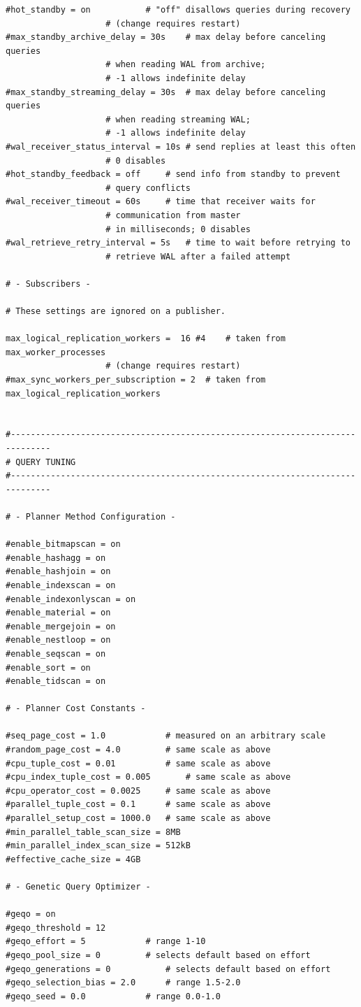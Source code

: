 \begin{verbatim}
#hot_standby = on			# "off" disallows queries during recovery
					# (change requires restart)
#max_standby_archive_delay = 30s	# max delay before canceling queries
					# when reading WAL from archive;
					# -1 allows indefinite delay
#max_standby_streaming_delay = 30s	# max delay before canceling queries
					# when reading streaming WAL;
					# -1 allows indefinite delay
#wal_receiver_status_interval = 10s	# send replies at least this often
					# 0 disables
#hot_standby_feedback = off		# send info from standby to prevent
					# query conflicts
#wal_receiver_timeout = 60s		# time that receiver waits for
					# communication from master
					# in milliseconds; 0 disables
#wal_retrieve_retry_interval = 5s	# time to wait before retrying to
					# retrieve WAL after a failed attempt

# - Subscribers -

# These settings are ignored on a publisher.

max_logical_replication_workers =  16 #4	# taken from max_worker_processes
					# (change requires restart)
#max_sync_workers_per_subscription = 2	# taken from max_logical_replication_workers


#------------------------------------------------------------------------------
# QUERY TUNING
#------------------------------------------------------------------------------

# - Planner Method Configuration -

#enable_bitmapscan = on
#enable_hashagg = on
#enable_hashjoin = on
#enable_indexscan = on
#enable_indexonlyscan = on
#enable_material = on
#enable_mergejoin = on
#enable_nestloop = on
#enable_seqscan = on
#enable_sort = on
#enable_tidscan = on

# - Planner Cost Constants -

#seq_page_cost = 1.0			# measured on an arbitrary scale
#random_page_cost = 4.0			# same scale as above
#cpu_tuple_cost = 0.01			# same scale as above
#cpu_index_tuple_cost = 0.005		# same scale as above
#cpu_operator_cost = 0.0025		# same scale as above
#parallel_tuple_cost = 0.1		# same scale as above
#parallel_setup_cost = 1000.0	# same scale as above
#min_parallel_table_scan_size = 8MB
#min_parallel_index_scan_size = 512kB
#effective_cache_size = 4GB

# - Genetic Query Optimizer -

#geqo = on
#geqo_threshold = 12
#geqo_effort = 5			# range 1-10
#geqo_pool_size = 0			# selects default based on effort
#geqo_generations = 0			# selects default based on effort
#geqo_selection_bias = 2.0		# range 1.5-2.0
#geqo_seed = 0.0			# range 0.0-1.0


\end{verbatim}

